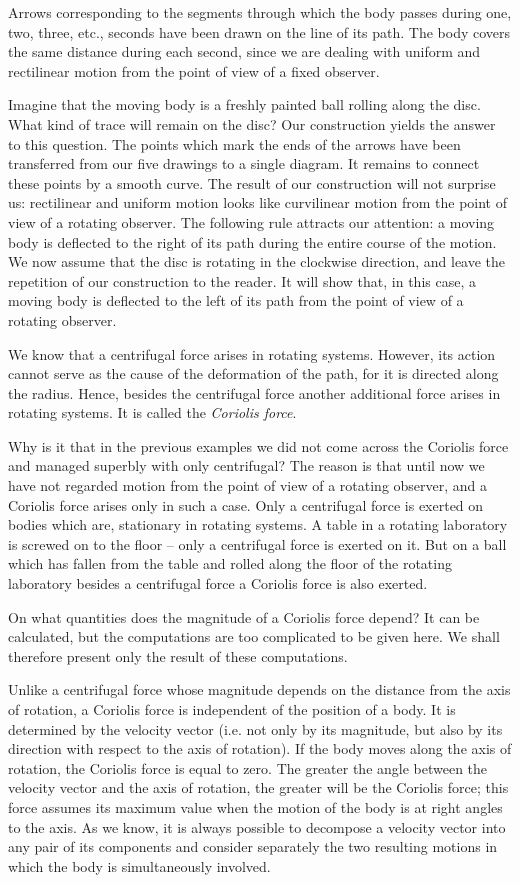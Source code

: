 Arrows corresponding to the segments through which
the body passes during one, two, three, etc., seconds have
been drawn on the line of its path. The body covers the
same distance during each second, since we are dealing
with uniform and rectilinear motion from the point
of view of a fixed observer.


Imagine that the moving body is a freshly painted ball
rolling along the disc. What kind of trace will remain on
the disc? Our construction yields the answer to this
question. The points which mark the ends of the arrows
have been transferred from our five drawings to a single
diagram. It remains to connect these points by a smooth
curve. The result of our construction will not surprise
us: rectilinear and uniform motion looks like curvilinear
motion from the point of view of a rotating observer. The
following rule attracts our attention: a moving body is
deflected to the right of its path during the entire course
of the motion. We now assume that the disc is rotating in
the clockwise direction, and leave the repetition of our
construction to the reader. It will show that, in this
case, a moving body is deflected to the left of its path
from the point of view of a rotating observer.

We know that a centrifugal force arises in rotating
systems. However, its action cannot serve as the cause of
the deformation of the path, for it is directed along the
radius. Hence, besides the centrifugal force another
additional force arises in rotating systems. It is called
the \emph{Coriolis force}.

Why is it that in the previous examples we did not
come across the Coriolis force and managed superbly with
only centrifugal? The reason is that until now we have
not regarded motion from the point of view of a rotating observer, and a Coriolis force arises only in such a case.
Only a centrifugal force is exerted on bodies which are,
stationary in rotating systems. A table in a rotating
laboratory is screwed on to the floor -- only a centrifugal
force is exerted on it. But on a ball which has fallen
from the table and rolled along the floor of the rotating
laboratory besides a centrifugal force a Coriolis force
is also exerted.

On what quantities does the magnitude of a Coriolis
force depend? It can be calculated, but the computations
are too complicated to be given here. We shall therefore
present only the result of these computations.

Unlike a centrifugal force whose magnitude depends
on the distance from the axis of rotation, a Coriolis force
is independent of the position of a body. It is determined
by the velocity vector (i.e. not only by its magnitude,
but also by its direction with respect to the axis of rotation). If the body moves along the axis of rotation, the
Coriolis force is equal to zero. The greater the angle
between the velocity vector and the axis of rotation, the
greater will be the Coriolis force; this force assumes its
maximum value when the motion of the body is at right
angles to the axis. As we know, it is always possible to
decompose a velocity vector into any pair of its components and consider separately the two resulting motions
in which the body is simultaneously involved.

